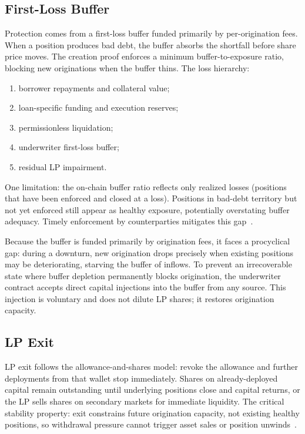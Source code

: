 \subsection{First-Loss Buffer}

Protection comes from a first-loss buffer funded primarily by per-origination fees. When a position produces bad debt, the buffer absorbs the shortfall before share price moves. The creation proof enforces a minimum buffer-to-exposure ratio, blocking new originations when the buffer thins. The loss hierarchy:
\begin{enumerate}
  \item borrower repayments and collateral value;
  \item loan-specific funding and execution reserves;
  \item permissionless liquidation;
  \item underwriter first-loss buffer;
  \item residual LP impairment.
\end{enumerate}

One limitation: the on-chain buffer ratio reflects only realized losses (positions that have been enforced and closed at a loss). Positions in bad-debt territory but not yet enforced still appear as healthy exposure, potentially overstating buffer adequacy. Timely enforcement by counterparties mitigates this gap~\cite{daloc-decent2026}.

Because the buffer is funded primarily by origination fees, it faces a procyclical gap: during a downturn, new origination drops precisely when existing positions may be deteriorating, starving the buffer of inflows. To prevent an irrecoverable state where buffer depletion permanently blocks origination, the underwriter contract accepts direct capital injections into the buffer from any source. This injection is voluntary and does not dilute LP shares; it restores origination capacity.

\subsection{LP Exit}

LP exit follows the allowance-and-shares model: revoke the allowance and further deployments from that wallet stop immediately. Shares on already-deployed capital remain outstanding until underlying positions close and capital returns, or the LP sells shares on secondary markets for immediate liquidity. The critical stability property: exit constrains future origination capacity, not existing healthy positions, so withdrawal pressure cannot trigger asset sales or position unwinds~\cite{daloc-decent2026}.

